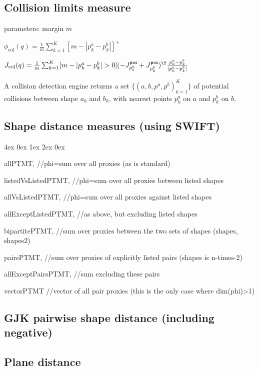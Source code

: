 \documentclass[10pt,fleqn,twoside]{article}
\newenvironment{items}{
\par\small
\begin{list}{--}{\leftmargin4ex \rightmargin0ex \labelsep1ex \labelwidth2ex
\topsep0pt \parsep0ex \itemsep3pt}
}{
\end{list}
}
\newcommand{\pos}{{\textsf{pos}}}
\begin{document}

\subsection{Collision limits measure}

parameters: margin $m$

$\phi_{\text{col}}(q) = \frac{1}{m}\sum_{k=1}^K [m-|p^a_k - p^b_k|]^+$

$J_{\text{col}}(q) = \frac{1}{m} \sum_{k=1}^K [m-|p^a_k - p^b_k|>0]
(- J^\pos_{p^a_k} + J^\pos_{p^b_k})^\T \frac{p^a_k - p^b_k}{|p^a_k - p^b_k|}$ 

A collision detection engine returns a set $\{
(a,b,p^a,p^b)_{k=1}^K \}$ of potential collisions between shape $a_k$
and $b_k$, with nearest points $p^a_k$ on $a$ and $p^b_k$ on $b$.


\subsection{Shape distance measures (using SWIFT)}

\begin{items}
\item  allPTMT, //phi=sum over all proxies (as is standard)
\item  listedVsListedPTMT, //phi=sum over all proxies between listed shapes
\item  allVsListedPTMT, //phi=sum over all proxies against listed shapes
\item  allExceptListedPTMT, //as above, but excluding listed shapes
\item  bipartitePTMT, //sum over proxies between the two sets of shapes (shapes, shapes2)
\item  pairsPTMT, //sum over proxies of explicitly listed pairs (shapes is n-times-2)
\item  allExceptPairsPTMT, //sum excluding these pairs
\item  vectorPTMT //vector of all pair proxies (this is the only case
  where dim(phi)>1)
\end{items}

\subsection{GJK pairwise shape distance (including negative)}

\subsection{Plane distance}
\end{document}

